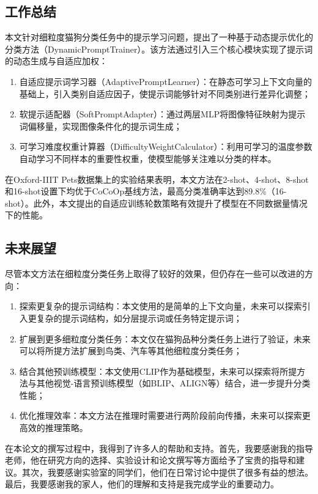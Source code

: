 \documentclass{HDU-Bachelor-Thesis}
\begin{document}
\subsection{工作总结}

本文针对细粒度猫狗分类任务中的提示学习问题，提出了一种基于动态提示优化的分类方法（DynamicPromptTrainer）。该方法通过引入三个核心模块实现了提示词的动态生成与自适应加权：

\begin{enumerate}
\item 自适应提示词学习器（AdaptivePromptLearner）：在静态可学习上下文向量的基础上，引入类别自适应因子，使提示词能够针对不同类别进行差异化调整；
\item 软提示适配器（SoftPromptAdapter）：通过两层MLP将图像特征映射为提示词偏移量，实现图像条件化的提示词生成；
\item 可学习难度权重计算器（DifficultyWeightCalculator）：利用可学习的温度参数自动学习不同样本的重要性权重，使模型能够关注难以分类的样本。
\end{enumerate}

在Oxford-IIIT Pets数据集上的实验结果表明，本文方法在2-shot、4-shot、8-shot和16-shot设置下均优于CoCoOp基线方法，最高分类准确率达到89.8\%（16-shot）。此外，本文提出的自适应训练轮数策略有效提升了模型在不同数据量情况下的性能。

\subsection{未来展望}

尽管本文方法在细粒度分类任务上取得了较好的效果，但仍存在一些可以改进的方向：

\begin{enumerate}
\item 探索更复杂的提示词结构：本文使用的是简单的上下文向量，未来可以探索引入更复杂的提示词结构，如分层提示词或任务特定提示词；
\item 扩展到更多细粒度分类任务：本文仅在猫狗品种分类任务上进行了验证，未来可以将所提方法扩展到鸟类、汽车等其他细粒度分类任务；
\item 结合其他预训练模型：本文使用CLIP作为基础模型，未来可以探索将所提方法与其他视觉-语言预训练模型（如BLIP、ALIGN等）结合，进一步提升分类性能；
\item 优化推理效率：本文方法在推理时需要进行两阶段前向传播，未来可以探索更高效的推理策略。
\end{enumerate}

\clearpage
{}

在本论文的撰写过程中，我得到了许多人的帮助和支持。首先，我要感谢我的指导老师，他在研究方向的选择、实验设计和论文撰写等方面给予了宝贵的指导和建议。其次，我要感谢实验室的同学们，他们在日常讨论中提供了很多有益的想法。最后，我要感谢我的家人，他们的理解和支持是我完成学业的重要动力。

\clearpage
{}
\printbibliography[heading=bibintoc]
\end{document}

